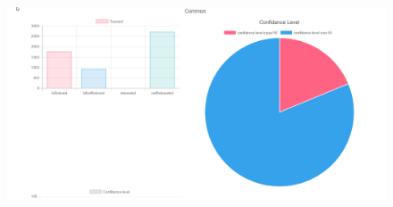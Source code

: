 \begin{figure}[h]
	\centering
	\includegraphics[width=\textwidth]{images/app2.png}
\end{figure}

\vfill

